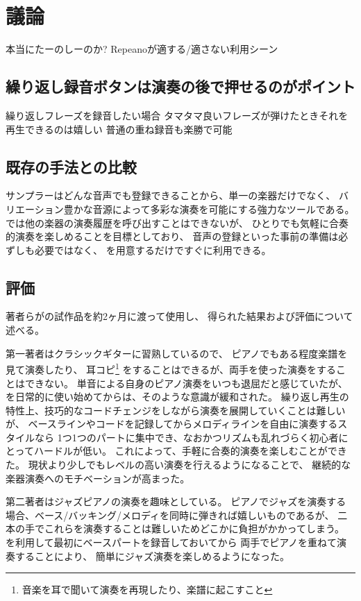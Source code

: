 \section{議論}

本当にたーのしーのか?
Repeanoが適する/適さない利用シーン

\subsection{繰り返し録音ボタンは演奏の後で押せるのがポイント}

繰り返しフレーズを録音したい場合
タマタマ良いフレーズが弾けたときそれを再生できるのは嬉しい
普通の重ね録音も楽勝で可能

\subsection{既存の手法との比較}
サンプラーはどんな音声でも登録できることから、単一の楽器だけでなく、
バリエーション豊かな音源によって多彩な演奏を可能にする強力なツールである。
{\system}では他の楽器の演奏履歴を呼び出すことはできないが、
ひとりでも気軽に合奏的演奏を楽しめることを目標としており、
音声の登録といった事前の準備は必ずしも必要ではなく、
{\system}を用意するだけですぐに利用できる。


\subsection{評価}

著者らが{\system}の試作品を約2ヶ月に渡って使用し、
得られた結果および評価について述べる。

第一著者はクラシックギターに習熟しているので、
ピアノでもある程度楽譜を見て演奏したり、
耳コピ\footnote{\textsf{音楽を耳で聞いて演奏を再現したり、楽譜に起こすこと}}
をすることはできるが、両手を使った演奏をすることはできない。
単音による自身のピアノ演奏をいつも退屈だと感じていたが、
{\system}を日常的に使い始めてからは、そのような意識が緩和された。
繰り返し再生の特性上、技巧的なコードチェンジをしながら演奏を展開していくことは難しいが、
ベースラインやコードを記録してからメロディラインを自由に演奏するスタイルなら
1つ1つのパートに集中でき、なおかつリズムも乱れづらく初心者にとってハードルが低い。
これによって、手軽に合奏的演奏を楽しむことができた。
現状より少しでもレベルの高い演奏を行えるようになることで、
継続的な楽器演奏へのモチベーションが高まった。

第二著者はジャズピアノの演奏を趣味としている。
ピアノでジャズを演奏する場合、ベース/バッキング/メロディを同時に弾きれば嬉しいものであるが、
二本の手でこれらを演奏することは難しいためどこかに負担がかかってしまう。
{\system}を利用して最初にベースパートを録音しておいてから
両手でピアノを重ねて演奏することにより、
簡単にジャズ演奏を楽しめるようになった。
